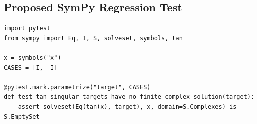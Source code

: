 \documentclass[11pt]{article}
\begin{document}
\subsection{Proposed SymPy Regression Test}

\medskip

\begin{lstlisting}[style=bugpython]
import pytest
from sympy import Eq, I, S, solveset, symbols, tan

x = symbols("x")
CASES = [I, -I]

@pytest.mark.parametrize("target", CASES)
def test_tan_singular_targets_have_no_finite_complex_solution(target):
    assert solveset(Eq(tan(x), target), x, domain=S.Complexes) is S.EmptySet
\end{lstlisting}
\end{document}
